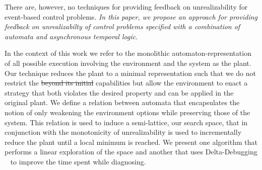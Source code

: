 There are, however, no techniques for providing feedback on unrealizability for 
event-based control problems. \emph{In this paper, we propose an approach for  
providing  feedback on unrealizabilty of control problems specified with a combination of 
automata and asynchronous temporal logic}.
%
%
%

In the context of this work we refer to the monolithic automaton-representation of all 
possible execution involving the environment and the system as the plant. Our 
technique reduces the plant to a minimal representation such that we do not restrict the 
 \sout{beyond its initial} capabilities but allow the 
environment to 
enact a strategy that both violates the desired property and can be applied in the 
original plant. We define a relation between automata that encapsulates the notion of 
only weakening the environment options while preserving those of the system. This 
relation is used to induce a semi-lattice, our search space, that in conjunction with the 
monotonicity of unrealizability is used to incrementally reduce the plant until a local 
minimum is reached. We present one algorithm that performs a linear exploration of the 
space and another that uses Delta-Debugging ~\cite{DBLP:journals/tse/ZellerH02} to 
 improve the time spent while diagnosing.


